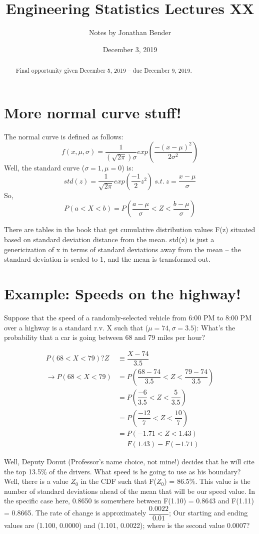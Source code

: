 \documentclass[]{article}
\title{Engineering Statistics Lectures XX}
\author{Notes by Jonathan Bender}
\date{December 3, 2019}
\begin{document}
	
	\maketitle
	
	\begin{abstract}
		Final opportunity given December 5, 2019 -- due December 9, 2019.
	\end{abstract}

	\section{More normal curve stuff!}
		The normal curve is defined as follows:
		$$f(x,\mu,\sigma) = \dfrac{1}{(\sqrt{2\pi})\sigma}exp(\dfrac{-(x-\mu)^2}{2\sigma^2})$$
		Well, the standard curve ($\sigma=1,\mu=0$) is:
		$$std(z) = \dfrac{1}{\sqrt{2\pi}}exp(\dfrac{-1}{2}z^2)\ s.t.\ z=\dfrac{x-\mu}{\sigma}$$
		So,
		$$P(a<X<b) = P(\dfrac{a-\mu}{\sigma} < Z < \dfrac{b-\mu}{\sigma})$$
		
		There are tables in the book that get cumulative distribution values F(z) situated based on standard deviation distance from the mean. std(z) is just a genericization of x in terms of standard deviations away from the mean -- the standard deviation is scaled to 1, and the mean is transformed out.
		
	\pagebreak
	\section{Example: Speeds on the highway!}
		Suppose that the speed of a randomly-selected vehicle from 6:00 PM to 8:00 PM over a highway is a standard r.v. X such that ($\mu = 74, \sigma = 3.5$): What's the probability that a car is going between 68 and 79 miles per hour?
		
		\begin{align*}
			P(68 < X < 79)? Z  &\equiv \dfrac{X - 74}{3.5} \\
			\to P(68 < X < 79) &= P(\dfrac{68-74}{3.5} < Z < \dfrac{79-74}{3.5}) \\
			                   &= P(\dfrac{-6}{3.5} < Z < \dfrac{5}{3.5}) \\
			                   &= P(\dfrac{-12}{7} < Z < \dfrac{10}{7}) \\
			                   &= P(-1.71 < Z < 1.43) \\
			                   &= F(1.43) - F(-1.71)
		\end{align*}
		
		Well, Deputy Donut (Professor's name choice, not mine!) decides that he will cite the top 13.5\% of the drivers. What speed is he going to use as his boundary?
		Well, there is a value $Z_0$ in the CDF such that F($Z_0$) = 86.5\%. This value is the number of standard deviations ahead of the mean that will be our speed value. In the specific case here, 0.8650 is somewhere between F(1.10) = 0.8643 and F(1.11) = 0.8665. The rate of change is approximately $\dfrac{0.0022}{0.01}$; Our starting and ending values are (1.100, 0.0000) and (1.101, 0.0022); where is the second value 0.0007?
		
\end{document}

